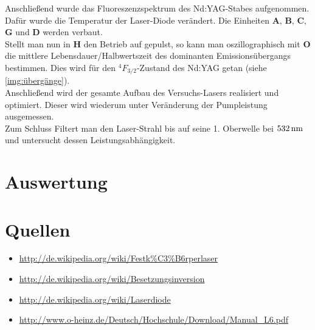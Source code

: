 \documentclass[numbers=noenddot,12pt,a4paper]{scrartcl}
\newcommand{\ix}[1]{_\text{#1}}
\newcommand{\fett}[1]{\textbf{#1}}
\begin{document}
Anschließend wurde das Fluoreszenzspektrum des Nd:YAG-Stabes aufgenommen. Dafür wurde die Temperatur der Laser-Diode verändert. Die Einheiten \fett{A}, \fett{B}, \fett{C}, \fett{G} und \fett{D} werden verbaut.\\
Stellt man nun in \fett{H} den Betrieb auf gepulst, so kann man oszillographisch mit \fett{O} die mittlere Lebensdauer/Halbwertszeit des dominanten Emissionsübergangs bestimmen. Dies wird für den $^{4}F\ix{3/2}$-Zustand des Nd:YAG getan (siehe \ref{img:übergänge}).\\
Anschließend wird der gesamte Aufbau des Versuchs-Lasers realisiert und optimiert. Dieser wird wiederum unter Veränderung der Pumpleistung ausgemessen.\\
Zum Schluss Filtert man den Laser-Strahl bis auf seine 1. Oberwelle bei $\unit[532]{nm}$ und untersucht dessen Leistungsabhängigkeit.
\pagebreak
\section{Auswertung}\label{sec:auswert}
\section{Quellen}
\begin{itemize}
	\item{\url{http://de.wikipedia.org/wiki/Festk%C3%B6rperlaser}}
	\item{\url{http://de.wikipedia.org/wiki/Besetzungsinversion}}
	\item{\url{http://de.wikipedia.org/wiki/Laserdiode}}
	\item{\url{http://www.o-heinz.de/Deutsch/Hochschule/Download/Manual_L6.pdf}}
\end{itemize}
\end{document}
